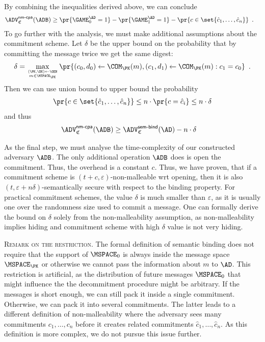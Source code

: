 \documentclass{crypto-exercise}
\newcommand{\CS}{\mathfrak{C}}
\newcommand{\advSEMBINDXX}[2]{\ADV_{#1}^{\mathsf{sem\text{-}bind}}(#2)}
\newcommand{\advNMOPENXX}[2]{\ADV^{\mathsf{nm\text{-}cpa}}_{#1}(#2)}
\begin{document}
\begin{solution}
By combining the inequalities derived above, we can conclude 
\begin{align*}
\advNMOPENXX{\CS}{\ADB}&\geq \pr{\GAME_0^\AD = 1}- \pr{\GAME_1^\AD = 1}- \pr{c \in \set{\hat{c}_1,\ldots,\hat{c}_n}}\enspace.
\end{align*}
To go further with the analysis, we must make additional assumptions about the commitment scheme. Let $\delta$ be the upper bound on the probability that by committing the message twice we get the same digest:
\begin{align*}
\delta=\max_{(\PK,\SK)\gets\GEN \atop m\in\MSPACE_\PK}\pr{(c_0,d_0)\gets\COM_\PK(m), (c_1,d_1)\gets\COM_\PK(m): c_1=c_0}\enspace.
\end{align*} 
Then we can use union bound to upper bound the probability
\begin{align*}
\pr{c \in \set{\hat{c}_1,\ldots,\hat{c}_n}}\leq n\cdot \pr{c=\hat{c}_i}\leq n\cdot\delta
\end{align*}
and thus 
\begin{align*}
\advNMOPENXX{\CS}{\ADB}&\geq\advSEMBINDXX{\CS}{\AD}-n\cdot\delta
\end{align*}

As the final step, we must analyse the time-complexity of our constructed adversary $\ADB$. The only additional operation $\ADB$ does is open the commitment. Thus, the overhead is a constant $c$. Thus, we have proven, that if a commitment scheme is $(t+c,\varepsilon)$-non-malleable wrt opening, then it is also $(t, \varepsilon+n\delta)$-semantically secure with respect to the binding property. For practical commitment schemes, the value $\delta$ is much smaller than $\varepsilon$, as it is usually one over the randomness size used to commit a message. One can formally derive the bound on $\delta$ solely from the non-malleability assumption, as non-malleability implies hiding and commitment scheme with high $\delta$ value is not very hiding.

\vspace*{3ex}
\noindent
\textsc{Remark on the restriction.} The formal definition of semantic binding does not require that the support of $\MSPACE_0$ is always inside the message space $\MSPACE_\PK$ or otherwise we cannot pass the information about $m$ to $\AD$. This restriction is artificial, as the distribution of future messages $\MSPACE_0$ that might influence the the decommitment procedure might be arbitrary. If the messages is short enough, we can still pack it inside a single commitment. Otherwise, we can pack it into several commitments. The latter leads to a different definition of non-malleability where the adversary sees many commitments $c_1,\ldots,c_n$ before it creates related commitments $\hat{c}_1,\ldots,\hat{c}_n$. As this definition is more complex, we do not pursue this issue further.        

\end{solution}
\end{document}
